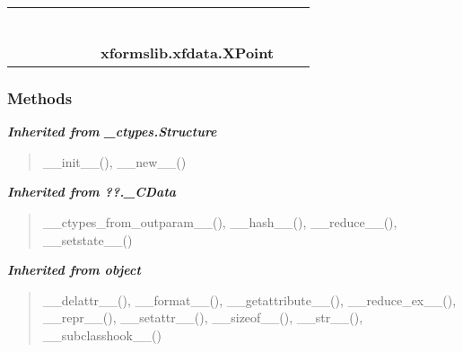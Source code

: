     \label{xformslib:xfdata:XPoint}
\begin{tabular}{cccccccccc}
\multicolumn{2}{r}{\settowidth{\BCL}{object}\multirow{2}{\BCL}{object}}
&&
&&
&&
  \\\cline{3-3}
  &&\multicolumn{1}{c|}{}
&&
&&
&&
  \\
\multicolumn{4}{r}{\settowidth{\BCL}{??.\_CData}\multirow{2}{\BCL}{??.\_CData}}
&&
&&
  \\\cline{5-5}
  &&&&\multicolumn{1}{c|}{}
&&
&&
  \\
\multicolumn{6}{r}{\settowidth{\BCL}{\_ctypes.Structure}\multirow{2}{\BCL}{\_ctypes.Structure}}
&&
  \\\cline{7-7}
  &&&&&&\multicolumn{1}{c|}{}
&&
  \\
&&&&&&\multicolumn{2}{l}{\textbf{xformslib.xfdata.XPoint}}
\end{tabular}



  \subsubsection{Methods}


\large{\textbf{\textit{Inherited from \_ctypes.Structure}}}

\begin{quote}
\_\_init\_\_(), \_\_new\_\_()
\end{quote}

\large{\textbf{\textit{Inherited from ??.\_CData}}}

\begin{quote}
\_\_ctypes\_from\_outparam\_\_(), \_\_hash\_\_(), \_\_reduce\_\_(), \_\_setstate\_\_()
\end{quote}

\large{\textbf{\textit{Inherited from object}}}

\begin{quote}
\_\_delattr\_\_(), \_\_format\_\_(), \_\_getattribute\_\_(), \_\_reduce\_ex\_\_(), \_\_repr\_\_(), \_\_setattr\_\_(), \_\_sizeof\_\_(), \_\_str\_\_(), \_\_subclasshook\_\_()
\end{quote}



